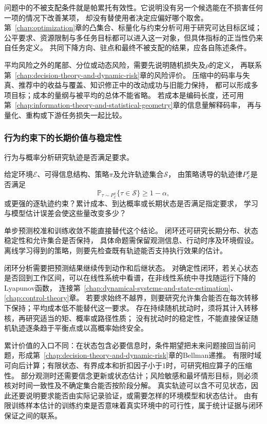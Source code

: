 问题中的不被支配条件就是帕累托有效性。它说明没有另一个候选能在不损害任何一项的情况下改善某项，
却没有替使用者决定应偏好哪个取舍。
第~\ref{chap:optimization}章的凸集合、标量化与约束分析可用于研究可达目标区域；
公平要求、资源限制与多任务目标都可以进入这一对象，但具体指标的正当性仍来自任务定义。
共同下降方向、驻点和最终不被支配的结果，应各自陈述条件。

平均风险之外的尾部、分位或动态风险，需要先说明随机损失及$\rho$的定义，
再联系第~\ref{chap:decision-theory-and-dynamic-risk}章的风险评价。
压缩中的码率与失真、推荐中的收益与覆盖、知识修正中的改动成功与旧能力保持，
都可以形成多项目标；成本的量纲与被平均的总体不能省略。
若成本是编码长度，还可用第~\ref{chap:information-theory-and-statistical-geometry}章的信息量解释码率，
再与量化、重构或下游任务损失一起比较。

\subsubsection{行为约束下的长期价值与稳定性}
\label{sec:future-analysis-closed-loop}

行为与概率分析研究轨迹是否满足要求。

\begin{mathproblem}[闭环轨迹能否满足长期要求]
  \label{question:future-closed-loop}
  给定环境$\mathcal E$、可得信息结构、策略$\pi$及允许轨迹集合$\mathcal S$，
  由策略诱导的轨迹律$P_{\mathcal E}^{\pi}$是否满足
  \[
    \mathbb P_{\tau\sim P_{\mathcal E}^{\pi}}\{\tau\in\mathcal S\}
    \geq1-\alpha,
  \]
  或更强的逐轨迹约束？累计成本、到达概率或长期状态是否满足指定要求，
  学习与模型估计误差会使这些量改变多少？
\end{mathproblem}

单步预测校准和训练收敛不能直接替代这个结论。
闭环还可研究长期分布、状态稳定性和允许集合是否保持，
具体命题需保留观测信息、行动时序及环境假设。
离线学习得到的策略，则要先检查既有轨迹能否支持执行效果的估计。

闭环分析需要把预测结果继续传到动作和后继状态。
对确定性闭环，若关心状态是否回到工作区间，可以在线性系统中看谱，在非线性系统中寻找随运行下降的Lyapunov函数，
连接第~\ref{chap:dynamical-systems-and-state-estimation}、\ref{chap:control-theory}章。
若要求始终不越界，则要研究允许集合能否在每次转移下保持；平均成本低不能替代这一要求。
存在持续随机扰动时，须将其计入转移核，再研究适当的矩、概率或路径性质；
没有扰动时的稳定性，不能直接保证随机轨迹逐条趋于平衡点或以高概率始终安全。

累计价值的入口不同：在状态包含必要信息时，条件期望把未来问题接回当前问题，形成第~\ref{chap:decision-theory-and-dynamic-risk}章的Bellman递推。
有限时域可向后计算；有限状态、有界成本和折扣因子小于$1$时，可研究相应算子的压缩性。
部分观测时还需要信念更新或状态估计；风险敏感和最坏情形目标，则必须核对时间一致性及不确定集合能否按阶段分解。
真实轨迹可以含不可见状态，因此还要说明要求能否由实际记录验证，或需要怎样的环境模型和状态估计。
由有限训练样本估计的训练约束是否意味着真实环境中的可行性，属于统计证据与闭环保证之间的联系。

